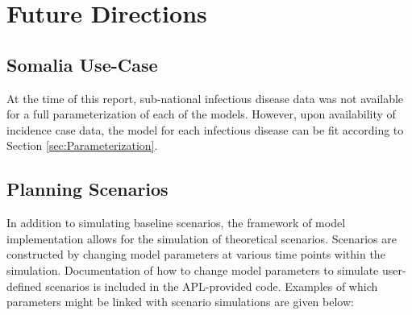 \documentclass[letter,12pt, usenames,dvipsnames]{article}
\begin{document}
\section{Future Directions}
\subsection{Somalia Use-Case}
At the time of this report, sub-national infectious disease data was not available for a full parameterization of each of the models. However, upon availability of incidence case data, the model for each infectious disease can be fit according to Section \ref{sec:Parameterization}.


\subsection{Planning Scenarios}
In addition to simulating baseline scenarios, the framework of model implementation allows for the simulation of theoretical scenarios. Scenarios are constructed by changing model parameters at various time points within the simulation. Documentation of how to change model parameters to simulate user-defined scenarios is included in the APL-provided code. Examples of which parameters might be linked with scenario simulations are given below:
\end{document}
